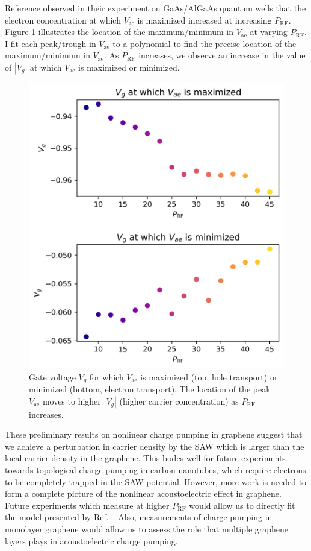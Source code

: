 \documentclass[double,12pt,1in,seploa]{beavtex}
\begin{document}
Reference \cite{rotter_nonlinear_1999} observed in their experiment on GaAs/AlGaAs quantum wells that the electron concentration at which $V_{\mathrm{ae}}$ is maximized increased at increasing $P_{\mathrm{RF}}$. Figure \ref{Vg at which vae is max or min} illustrates the location of the maximum/minimum in $V_{\mathrm{ae}}$ at varying $P_{\mathrm{RF}}$. I fit each peak/trough in $V_{\mathrm{ae}}$ to a polynomial to find the precise location of the maximum/minimum in $V_{\mathrm{ae}}$. As $P_{\mathrm{RF}}$ increases, we observe an increase in the value of $|V_g|$ at which $V_{\mathrm{ae}}$ is maximized or minimized. 

\begin{figure}
    \includegraphics{Vg at which vae is max or min.png}
    \caption{Gate voltage $V_g$ for which $V_{\mathrm{ae}}$ is maximized (top, hole transport) or minimized (bottom, electron transport). The location of the peak $V_{\mathrm{ae}}$ moves to higher $|V_g|$ (higher carrier concentration) as $P_{\mathrm{RF}}$ increases.}
    \label{Vg at which vae is max or min}
\end{figure}


These preliminary results on nonlinear charge pumping in graphene suggest that we achieve a perturbation in carrier density by the SAW which is larger than the local carrier density in the graphene. This bodes well for future experiments towards topological charge pumping in carbon nanotubes, which require electrons to be completely trapped in the SAW potential. However, more work is needed to form a complete picture of the nonlinear acoustoelectric effect in graphene. Future experiments which measure at higher $P_{\mathrm{RF}}$ would allow us to directly fit the model presented by Ref.\ \cite{rotter_nonlinear_1999}. Also, measurements of charge pumping in monolayer graphene would allow us to assess the role that multiple graphene layers plays in acoustoelectric charge pumping. 
\end{document}
